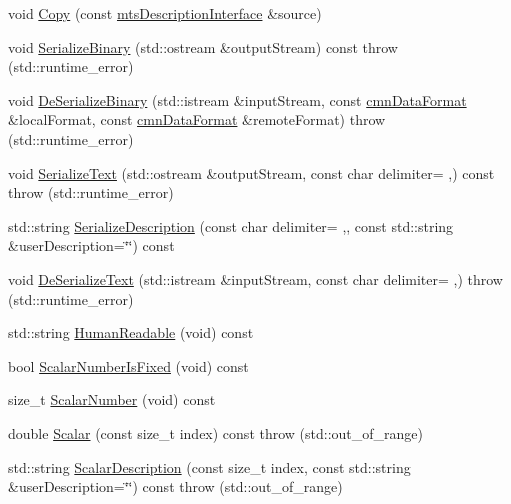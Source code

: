 \begin{DoxyCompactItemize}
\item 
void \hyperlink{classmts_description_interface_aa7af3614c532d37c59e3a4f3e0efec00}{Copy} (const \hyperlink{classmts_description_interface}{mts\+Description\+Interface} \&source)
\item 
void \hyperlink{classmts_description_interface_adc40d04bbdee8837562007b6d9427664}{Serialize\+Binary} (std\+::ostream \&output\+Stream) const   throw (std\+::runtime\+\_\+error)
\item 
void \hyperlink{classmts_description_interface_a7b0b3af98f4406df87e9a9b44e0e11ea}{De\+Serialize\+Binary} (std\+::istream \&input\+Stream, const \hyperlink{classcmn_data_format}{cmn\+Data\+Format} \&local\+Format, const \hyperlink{classcmn_data_format}{cmn\+Data\+Format} \&remote\+Format)  throw (std\+::runtime\+\_\+error)
\item 
void \hyperlink{classmts_description_interface_a540707553661dfd862c9433f3c57f6b2}{Serialize\+Text} (std\+::ostream \&output\+Stream, const char delimiter= \textquotesingle{},\textquotesingle{}) const   throw (std\+::runtime\+\_\+error)
\item 
std\+::string \hyperlink{classmts_description_interface_a3f679702acc7acbcd8c8aa7072ee6640}{Serialize\+Description} (const char delimiter= \textquotesingle{},\textquotesingle{}, const std\+::string \&user\+Description=\char`\"{}\char`\"{}) const 
\item 
void \hyperlink{classmts_description_interface_a6a0e72813a01d7f162ebdd80fd102cb9}{De\+Serialize\+Text} (std\+::istream \&input\+Stream, const char delimiter= \textquotesingle{},\textquotesingle{})  throw (std\+::runtime\+\_\+error)
\item 
std\+::string \hyperlink{classmts_description_interface_a5e38034e0db5510ce2dae71d192a1ded}{Human\+Readable} (void) const 
\item 
bool \hyperlink{classmts_description_interface_a7d8f050a390b5636ebd931483ef564ea}{Scalar\+Number\+Is\+Fixed} (void) const 
\item 
size\+\_\+t \hyperlink{classmts_description_interface_a1b31753c7ef6ac45d9205ff8474acc3e}{Scalar\+Number} (void) const 
\item 
double \hyperlink{classmts_description_interface_a123c72143f8b1e39b4046549dc50f252}{Scalar} (const size\+\_\+t index) const   throw (std\+::out\+\_\+of\+\_\+range)
\item 
std\+::string \hyperlink{classmts_description_interface_a5e433f8e5447700e860f15756868bef0}{Scalar\+Description} (const size\+\_\+t index, const std\+::string \&user\+Description=\char`\"{}\char`\"{}) const   throw (std\+::out\+\_\+of\+\_\+range)
\end{DoxyCompactItemize}
